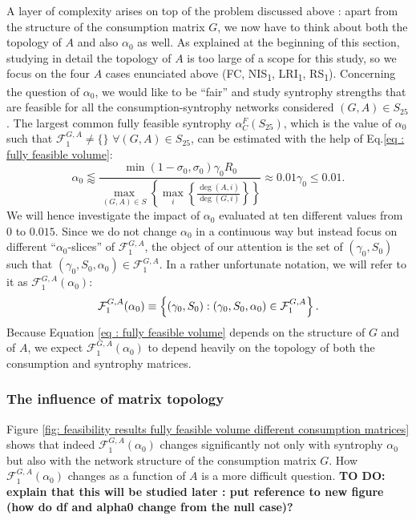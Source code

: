 \documentclass[12pt, titlepage]{report}
\begin{document}
A layer of complexity arises on top of the problem discussed above%
: apart from the structure of the consumption matrix $G$, we now have to think about both the topology of $A$ and also $\alpha_0$ as well. As explained at the beginning of this section, studying in detail the topology of $A$ is too large of a scope for this study, so we focus on the four $A$ cases enunciated above (FC, NIS\textsubscript{1}, LRI\textsubscript{1}, RS\textsubscript{1}). Concerning the question of $\alpha_0$, we would like to be ``fair'' and study syntrophy strengths that are feasible for all the consumption-syntrophy networks considered $(G,A) \in S_{25}$.
  The largest common fully feasible syntrophy $\alpha_C^F(S_{25})$, which is the value of $\alpha_0$ such that $\mathcal{F}^{G,A}_1 \neq \{\}$ $\forall (G,A) \in S_{25}$, can be estimated with the help of Eq.\eqref{eq : fully feasible volume}:
  \begin{equation}
  \alpha_0 \lessapprox \frac{\min(1-\sigma_0, \sigma_0)\gamma_0 R_0}{\max_{(G,A)\in S}\left\{\max_i\left\{\frac{\deg(A,i)}{\deg(G,i)}\right\}\right\}} \approx 0.01 \gamma_0 \leq 0.01. \label{eq : results feasibility largest alpha0}
  \end{equation}
  We will hence investigate the impact of $\alpha_0$ evaluated at ten different values from $0$ to $0.015$. %
  Since we do not change $\alpha_0$ in a continuous way but instead focus on different ``$\alpha_0$-slices'' of $\mathcal{F}^{G,A}_1$, the object of our attention is the set of $(\gamma_0, S_0)$ such that $(\gamma_0, S_0, \alpha_0) \in \mathcal{F}^{G,A}_1$. In a rather unfortunate notation, we will refer to it as $\mathcal{F}^{G,A}_1(\alpha_0)$:
  \begin{equation}
  \mathcal{F}^{G,A}_1(\alpha_0) \equiv \left\{(\gamma_0, S_0) : (\gamma_0, S_0, \alpha_0) \in \mathcal{F}^{G,A}_1 \right\}.
  \end{equation}
  Because Equation \eqref{eq : fully feasible volume} depends on the structure of $G$ and of $A$, we expect $\mathcal{F}^{G,A}_1(\alpha_0)$ to depend heavily on the topology of both the consumption and syntrophy matrices.

  \subsubsection{The influence of matrix topology}
  Figure \ref{fig: feasibility results fully feasible volume different consumption matrices} shows that indeed $\mathcal{F}^{G,A}_1(\alpha_0)$ changes significantly not only with syntrophy $\alpha_0$ but also with the network structure of the consumption matrix $G$. How $\mathcal{F}^{G,A}_1(\alpha_0)$ changes as a function of $A$ is a more difficult question. \textbf{TO DO: explain that this will be studied later : put reference to new figure (how do df and alpha0 change from the null case)?}
\end{document}
